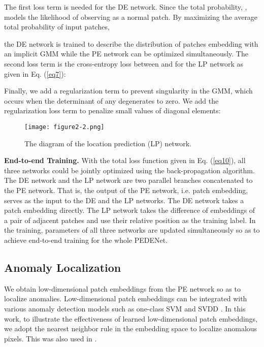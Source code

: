 \documentclass{article}
\begin{document}
The first loss term is needed for the DE network. Since the total
probability, , models the likelihood of observing
 as a normal patch. By maximizing the average total
probability of input patches,

the DE network is trained to describe the distribution of patches
embedding with an implicit GMM while the PE network can be optimized
simultaneously.  The second loss term is the cross-entropy loss between
 and  for the LP network as given in Eq. (\ref{eq7}):

Finally, we add a regularization term to prevent singularity in the 
GMM, which occurs when the determinant of any 
degenerates to zero. We add the regularization loss term to
penalize small values of diagonal elements:


\begin{figure}[!t]
\centering
\texttt{[image: figure2-2.png]}
\caption{The diagram of the location prediction (LP) network.}\label{fig:2b}
\end{figure}


{\bf End-to-end Training.} With the total loss function given in Eq.
(\ref{eq10}), all three networks could be jointly optimized using the
back-propagation algorithm. The DE network and the LP network are two
parallel branches concatenated to the PE network. That is, the output of
the PE network, i.e. patch embedding, serves as the input to the DE and
the LP networks. The DE network takes a patch embedding directly. The LP
network takes the difference of embeddings of a pair of adjacent patches
and use their relative position as the training label.  In the training,
parameters of all three networks are updated simultaneously so as to
achieve end-to-end training for the whole PEDENet. 

\subsection{Anomaly Localization}\label{subsec:localization}

We obtain low-dimensional patch embeddings from the PE
network so as to localize anomalies.  Low-dimensional patch embeddings
can be integrated with various anomaly detection models such as
one-class SVM \cite{chen2001one} and SVDD \cite{tax2004support}.  In
this work, to illustrate the effectiveness of learned low-dimensional
patch embeddings, we adopt the nearest neighbor rule in the embedding
space to localize anomalous pixels. This was also used in
\cite{cohen2020sub, yi2020patch}.
\end{document}
